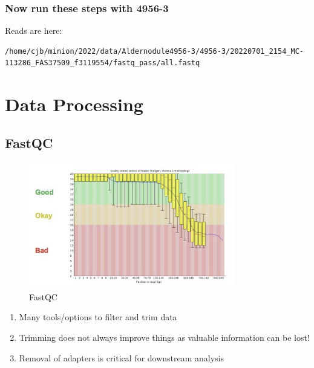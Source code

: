 \documentclass[
]{book}
\providecommand{\tightlist}{%
  \setlength{\itemsep}{0pt}\setlength{\parskip}{0pt}}
\begin{document}
\hypertarget{now-run-these-steps-with-4956-3}{%
\subsection*{Now run these steps with 4956-3}\label{now-run-these-steps-with-4956-3}}

Reads are here:

\begin{verbatim}
/home/cjb/minion/2022/data/Aldernodule4956-3/4956-3/20220701_2154_MC-113286_FAS37509_f3119554/fastq_pass/all.fastq
\end{verbatim}

\hypertarget{data-processing}{%
\chapter{Data Processing}\label{data-processing}}

\hypertarget{fastqc}{%
\section{FastQC}\label{fastqc}}

\begin{figure}
\centering
\includegraphics[width=0.8\textwidth,height=\textheight]{./Figures/FastQC.png}
\caption{FastQC}
\end{figure}

\begin{enumerate}
\def\labelenumi{\arabic{enumi}.}
\tightlist
\item
  Many tools/options to filter and trim data
\item
  Trimming does not always improve things as valuable information
  can be lost!
\item
  Removal of adapters is critical for downstream analysis
\end{enumerate}
\end{document}
